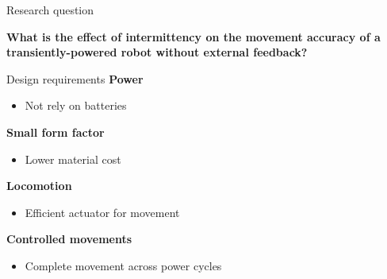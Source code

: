 \documentclass{beamer}
\begin{document}
\begin{frame}{Research question}
	\begin{center}
		\textbf{What is the effect of intermittency on the movement accuracy of a transiently-powered robot without external feedback?}
	\end{center}
\end{frame}

\begin{frame}{Design requirements}
	\textbf{Power} \\
	\begin{itemize}
		\item Not rely on batteries
	\end{itemize}
	\textbf{Small form factor} \\
	\begin{itemize}
		\item Lower material cost
	\end{itemize}
    \textbf{Locomotion} \\
    \begin{itemize}
    	\item Efficient actuator for movement
    \end{itemize}
    \textbf{Controlled movements} \\
    \begin{itemize}
    	\item Complete movement across power cycles
    \end{itemize}
\end{frame}

\end{document}
